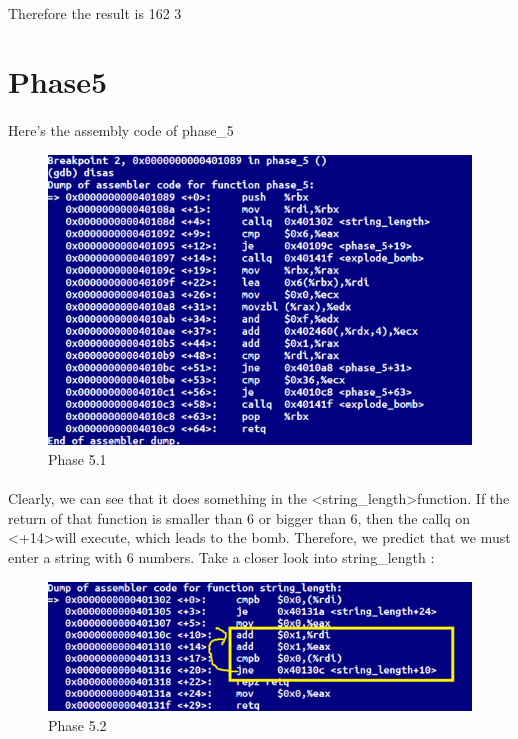 \documentclass[a4paper]{article}
\begin{document}
\paragraph{} Therefore the result is 162 3

\section{Phase5}

\paragraph{}
Here's the assembly code of phase\_5 

\begin{figure}[h!]
  \includegraphics[width=\linewidth]{bai5_1.png}
  \caption{Phase 5.1}
  \label{}
\end{figure}


\paragraph{}
Clearly, we can see that it does something in the \textless string\_length\textgreater function. If the return of that function is smaller than 6 or bigger than 6, then the callq on \textless +14\textgreater will execute, which leads to the bomb. Therefore, we predict that we must enter a string with 6 numbers. Take a closer look into string\_length : 

\begin{figure}[h!]
  \includegraphics[width=\linewidth]{bai5_2.png}
  \caption{Phase 5.2}
  \label{}
\end{figure}
\end{document}

